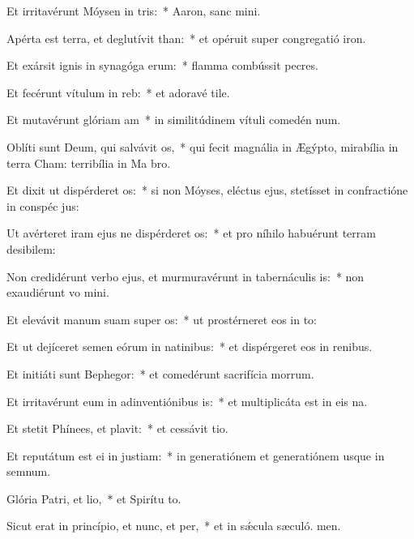 \item Et irritavérunt Móysen in tris:~* Aaron, sanc mini.
\item Apérta est terra, et deglutívit than:~* et opéruit super congregatió iron.
\item Et exársit ignis in synagóga erum:~* flamma combússit pecres.
\item Et fecérunt vítulum in reb:~* et adoravé tile.
\item Et mutavérunt glóriam am~* in similitúdinem vítuli comedén num.
\item Oblíti sunt Deum, qui salvávit os,~* qui fecit magnália in Ægýpto, mirabília in terra Cham: terribília in Ma bro.
\item Et dixit ut dispérderet os:~* si non Móyses, eléctus ejus, stetísset in confractióne in conspéc jus:
\item Ut avérteret iram ejus ne dispérderet os:~* et pro níhilo habuérunt terram desibilem:
\item Non credidérunt verbo ejus, et murmuravérunt in tabernáculis is:~* non exaudiérunt vo mini.
\item Et elevávit manum suam super os:~* ut prostérneret eos in to:
\item Et ut dejíceret semen eórum in natinibus:~* et dispérgeret eos in renibus.
\item Et initiáti sunt Bephegor:~* et comedérunt sacrifícia morrum.
\item Et irritavérunt eum in adinventiónibus is:~* et multiplicáta est in eis na.
\item Et stetit Phínees, et plavit:~* et cessávit tio.
\item Et reputátum est ei in justiam:~* in generatiónem et generatiónem usque in semnum.
\item Glória Patri, et lio,~* et Spirítu to.
\item Sicut erat in princípio, et nunc, et per,~* et in sǽcula sæculó. men.

